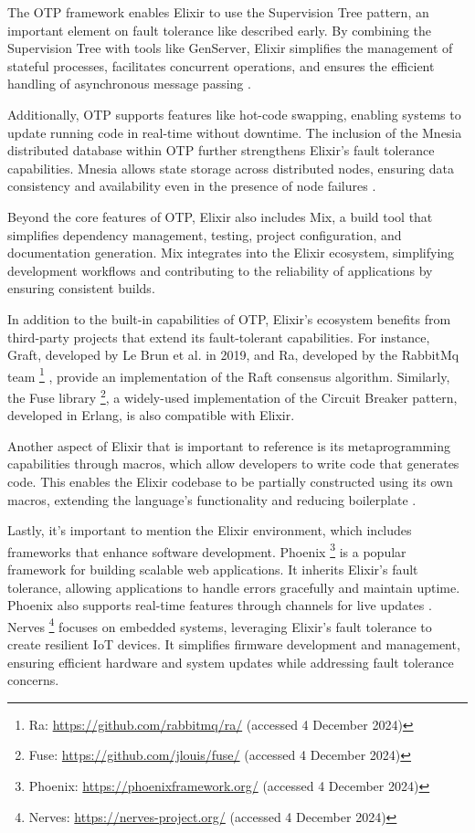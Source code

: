 The \gls{OTP} framework enables Elixir to use the Supervision Tree pattern, an important element on fault tolerance like described early. By combining the Supervision Tree with tools like GenServer, Elixir simplifies the management of stateful processes, facilitates concurrent operations, and ensures the efficient handling of asynchronous message passing \cite{elixir-docs-hexdocs}.

Additionally, \gls{OTP} supports features like hot-code swapping, enabling systems to update running code in real-time without downtime. The inclusion of the Mnesia distributed database within \gls{OTP} further strengthens Elixir’s fault tolerance capabilities. Mnesia allows state storage across distributed nodes, ensuring data consistency and availability even in the presence of node failures \cite{elixir-docs-hexdocs,elixir-school}.

Beyond the core features of \gls{OTP}, Elixir also includes Mix, a build tool that simplifies dependency management, testing, project configuration, and documentation generation. Mix integrates into the Elixir ecosystem, simplifying development workflows and contributing to the reliability of applications by ensuring consistent builds\cite{elixir-docs-hexdocs,elixir-school}.

In addition to the built-in capabilities of \gls{OTP}, Elixir’s ecosystem benefits from third-party projects that extend its fault-tolerant capabilities. For instance, Graft, developed by Le Brun et al. \cite{LeBrun2021} in 2019, and Ra, developed by the RabbitMq team
\footnote{Ra: \url{https://github.com/rabbitmq/ra/} (accessed 4 December 2024)}
, provide an implementation of the Raft consensus algorithm. Similarly, the Fuse library
\footnote{Fuse: \url{https://github.com/jlouis/fuse/} (accessed 4 December 2024)},
a widely-used implementation of the Circuit Breaker pattern, developed in Erlang, is also compatible with Elixir.

Another aspect of Elixir that is important to reference is its metaprogramming capabilities through macros, which allow developers to write code that generates code. This enables the Elixir codebase to be partially constructed using its own macros, extending the language's functionality and reducing boilerplate \cite{Juric2024}.

Lastly, it's important to mention the Elixir environment, which includes frameworks that enhance software development. Phoenix
\footnote{Phoenix: \url{https://phoenixframework.org/} (accessed 4 December 2024)}
is a popular framework for building scalable web applications. It inherits Elixir's fault tolerance, allowing applications to handle errors gracefully and maintain uptime. Phoenix also supports real-time features through channels for live updates \cite{Juric2024}. Nerves
\footnote{Nerves: \url{https://nerves-project.org/} (accessed 4 December 2024)}
focuses on embedded systems, leveraging Elixir's fault tolerance to create resilient IoT devices. It simplifies firmware development and management, ensuring efficient hardware and system updates while addressing fault tolerance concerns.

